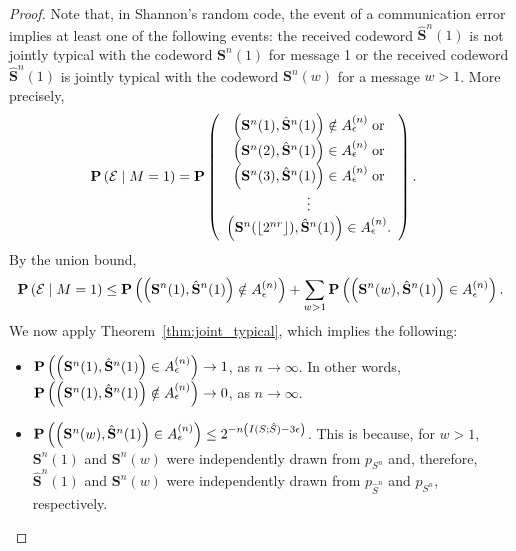 \begin{proof}
Note that, in Shannon's random code, the event of a communication error implies at least one of the following events: the received codeword $\hat{\mathbf{S}}^n(1)$ is not jointly typical with the codeword $\mathbf{S}^n(1)$ for message 1 or the received codeword $\hat{\mathbf{S}}^n(1)$ is jointly typical with the codeword $\mathbf{S}^n(w)$ for a message $w > 1$. More precisely,
%
\begin{align*}
\mathbf{P}\left(\mathcal{E} \mid M = 1\right) &= \mathbf{P}\left(
\begin{array}{c}
\left(\mathbf{S}^n(1), \hat{\mathbf{S}}^n(1)\right) \notin A^{(n)}_{\epsilon} \; \text{or}\\
\left(\mathbf{S}^n(2), \hat{\mathbf{S}}^n(1)\right) \in A^{(n)}_{\epsilon} \; \text{or}\\
\left(\mathbf{S}^n(3), \hat{\mathbf{S}}^n(1)\right) \in A^{(n)}_{\epsilon} \; \text{or}\\
\vdots\\
\left(\mathbf{S}^n(\lfloor2^{nr}\rfloor), \hat{\mathbf{S}}^n(1)\right) \in A^{(n)}_{\epsilon}.
\end{array}
\right).
\end{align*}
%
By the union bound,
%
$$\mathbf{P}\left(\mathcal{E} \mid M = 1\right) \leq \mathbf{P}\left(\left(\mathbf{S}^n(1), \hat{\mathbf{S}}^n(1)\right) \notin A^{(n)}_{\epsilon}\right) + \sum_{w > 1}\mathbf{P}\left(\left(\mathbf{S}^n(w), \hat{\mathbf{S}}^n(1)\right) \in A^{(n)}_{\epsilon}\right).$$
%
We now apply Theorem~\ref{thm:joint_typical}, which implies the following:

\begin{itemize}
\item $\mathbf{P}\left(\left(\mathbf{S}^n(1), \hat{\mathbf{S}}^n(1)\right) \in A^{(n)}_{\epsilon}\right) \to 1$, as $n \to \infty$. In other words, $\mathbf{P}\left(\left(\mathbf{S}^n(1), \hat{\mathbf{S}}^n(1)\right) \notin A^{(n)}_{\epsilon}\right) \to 0$, as $n \to \infty$.
\item $\mathbf{P}\left(\left(\mathbf{S}^n(w), \hat{\mathbf{S}}^n(1)\right) \in A^{(n)}_{\epsilon}\right) \leq 2^{-n\left(I(S;\hat{S})-3\epsilon\right)}$. This is because, for $w > 1$, $\mathbf{S}^n(1)$ and $\mathbf{S}^n(w)$ were independently drawn from $p_{S^n}$ and, therefore, $\hat{\mathbf{S}}^n(1)$ and $\mathbf{S}^n(w)$ were independently drawn from $p_{\hat{S}^n}$ and $p_{S^n}$, respectively.
\end{itemize}


\end{proof}
